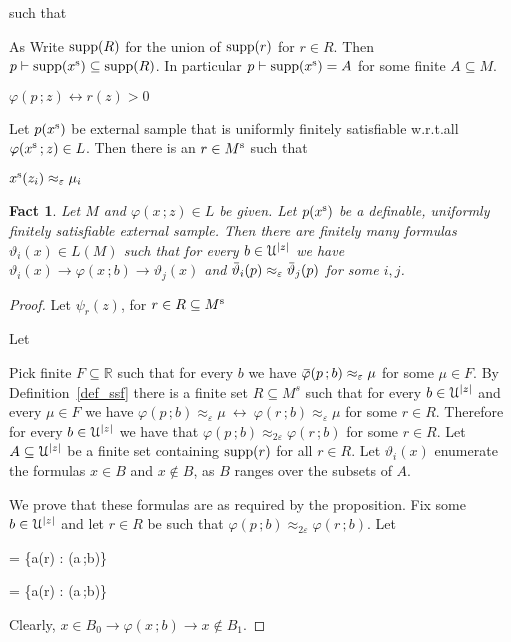\documentclass[10pt,openany]{article}
\def\proves{\vdash}
\def\proves{\vdash}
\def\RR{\mathds R}
\def\supp{\mathop{\rm supp}}
\newcommand{\sbar}[1]{\mkern 3mu\overline{\mkern-3mu#1\mkern-1mu}\mkern 1mu}
\newcommand{\barU}{\mkern 2mu\overline{\mkern-2mu\U\mkern-2mu}\mkern 2mu}
\newcommand{\barL}{\mkern 2.5mu\overline{\mkern-2.5mu L\mkern-3.5mu}\mkern 3.5mu}
\def\imp{\rightarrow}
\def\iff{\leftrightarrow}
\def\U{\EuScript U}
\def\theta{\vartheta}
\def\phi{\varphi}
\def\epsilon{\varepsilon}
\newcounter{thm}[section]
\theoremstyle{mio}
\newtheorem{fact}[thm]{Fact}
\theoremstyle{liscio}
\begin{document}
\ceq{\hfill p(x^{\rm s})}{\proves}{x^{\rm s}(b)>0\iff r(b)>0} such that

As 
Write $\supp(R)$ for the union of $\supp(r)$ for $r\in R$.
%
Then $p\proves \supp(x^{\rm s}) \subseteq \supp(R)$.
%
In particular $p\proves \supp(x^{\rm s}) = A$ for some finite $A\subseteq M$.
%


$\phi(p\,;z) \iff r(z)>0$






Let $p(x^{\rm s})$ be external sample that is uniformly finitely satisfiable w.r.t.\@ all $\phi(x^{\rm s}\,;z)\in L$.
%
Then there is an $r\in M^{\rm s}$ such that 

$x^{\rm s}(z_i)\approx_\epsilon\mu_i$




\begin{fact}
  Let $M$ and $\phi(x\,;z)\in L$ be given.
  Let $p(x^{\rm s})$ be a definable, uniformly finitely satisfiable external sample.
  Then there are finitely many formulas $\theta_i(x)\in L(M)$ such that for every $b\in\U^{|z|}$ we have $\theta_i(x)\imp\phi(x\,;b)\imp\theta_j(x)$ and $\sbar\theta_i(p)\approx_\epsilon\sbar\theta_j(p)$ for some $i,j$.
\end{fact}

\begin{proof}
  Let $\psi_r(z)$, for $r\in R\subseteq M^{\rm s}$

  Let 


  Pick finite $F\subseteq\RR$ such that for every $b$ we have $\sbar\phi(p\,;b)\approx_{\epsilon}\mu$ for some $\mu\in F$.
  By Definition~\ref{def_ssf} there is a finite set $R\subseteq M^s$ such that for every $b\in\U^{|z|}$ and every $\mu\in F$ we have $\phi(p\,;b)\approx_{\epsilon}\mu\ \iff\ \phi(r\,;b)\approx_{\epsilon}\mu$ for some $r\in R$.
  Therefore for every $b\in\U^{|z|}$ we have that $\phi(p\,;b)\approx_{2\epsilon}\phi(r\,;b)$ for some $r\in R$.
  Let $A\subseteq\U^{|z|}$ be a finite set containing $\supp(r)$ for all $r\in R$. 
  Let $\theta_i(x)$ enumerate the formulas $x\in B$ and $x\notin B$, as $B$ ranges over the subsets of $A$.
  
  We prove that these formulas are as required by the proposition.
  Fix some $b\in\U^{|z|}$ and let $r\in R$ be such that $\phi(p\,;b)\approx_{2\epsilon}\phi(r\,;b)$.
  Let

  {=}
  {\{a\in\supp(r) : \phi(a\,;b)\}}
  
  {=}
  {\{a\in\supp(r) : \neg\phi(a\,;b)\}}

  Clearly, $x\in B_0\imp \phi(x\,;b)\imp x\notin B_1$.
\end{proof}
\end{document}
